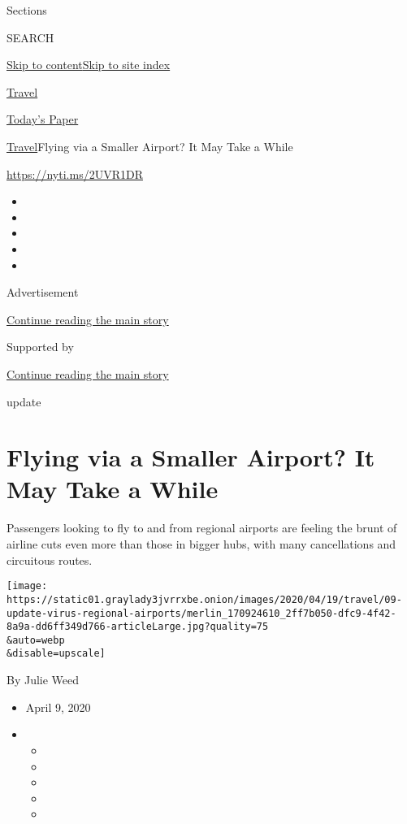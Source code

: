 Sections

SEARCH

\protect\hyperlink{site-content}{Skip to
content}\protect\hyperlink{site-index}{Skip to site index}

\href{https://www.nytimes3xbfgragh.onion/section/travel}{Travel}

\href{https://myaccount.nytimes3xbfgragh.onion/auth/login?response_type=cookie\&client_id=vi}{}

\href{https://www.nytimes3xbfgragh.onion/section/todayspaper}{Today's
Paper}

\href{/section/travel}{Travel}\textbar{}Flying via a Smaller Airport? It
May Take a While

\url{https://nyti.ms/2UVR1DR}

\begin{itemize}
\item
\item
\item
\item
\item
\end{itemize}

Advertisement

\protect\hyperlink{after-top}{Continue reading the main story}

Supported by

\protect\hyperlink{after-sponsor}{Continue reading the main story}

update

\hypertarget{flying-via-a-smaller-airport-it-may-take-a-while}{%
\section{Flying via a Smaller Airport? It May Take a
While}\label{flying-via-a-smaller-airport-it-may-take-a-while}}

Passengers looking to fly to and from regional airports are feeling the
brunt of airline cuts even more than those in bigger hubs, with many
cancellations and circuitous routes.

\texttt{[image: https://static01.graylady3jvrrxbe.onion/images/2020/04/19/travel/09-update-virus-regional-airports/merlin\_170924610\_2ff7b050-dfc9-4f42-8a9a-dd6ff349d766-articleLarge.jpg?quality=75\\\&auto=webp\\\&disable=upscale]}

By Julie Weed

\begin{itemize}
\item
  April 9, 2020
\item
  \begin{itemize}
  \item
  \item
  \item
  \item
  \item
  \end{itemize}
\end{itemize}

